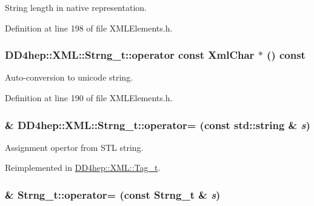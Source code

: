 String length in native representation. 

Definition at line 198 of file XMLElements.h.\hypertarget{class_d_d4hep_1_1_x_m_l_1_1_strng__t_a9621264c8adfc8db039b712c3508a08f}{
\subsubsection[{operator const XmlChar $\ast$}]{\setlength{\rightskip}{0pt plus 5cm}DD4hep::XML::Strng\_\-t::operator const {\bf XmlChar} $\ast$ () const}}
\label{class_d_d4hep_1_1_x_m_l_1_1_strng__t_a9621264c8adfc8db039b712c3508a08f}


Auto-\/conversion to unicode string. 

Definition at line 190 of file XMLElements.h.\hypertarget{class_d_d4hep_1_1_x_m_l_1_1_strng__t_ae37ccdb03f29e5e501bb050778efa386}{
\subsubsection[{operator=}]{\& DD4hep::XML::Strng\_\-t::operator= (const std::string \& {\em s})}}
\label{class_d_d4hep_1_1_x_m_l_1_1_strng__t_ae37ccdb03f29e5e501bb050778efa386}


Assignment opertor from STL string. 

Reimplemented in \hyperlink{class_d_d4hep_1_1_x_m_l_1_1_tag__t_aba04bd331a49bea4bdc163fe36522e84}{DD4hep::XML::Tag\_\-t}.\hypertarget{class_d_d4hep_1_1_x_m_l_1_1_strng__t_a27581bce0d2c52f93ca9cf5151779c5d}{
\subsubsection[{operator=}]{ \& Strng\_\-t::operator= (const {\bf Strng\_\-t} \& {\em s})}}
\label{class_d_d4hep_1_1_x_m_l_1_1_strng__t_a27581bce0d2c52f93ca9cf5151779c5d}



